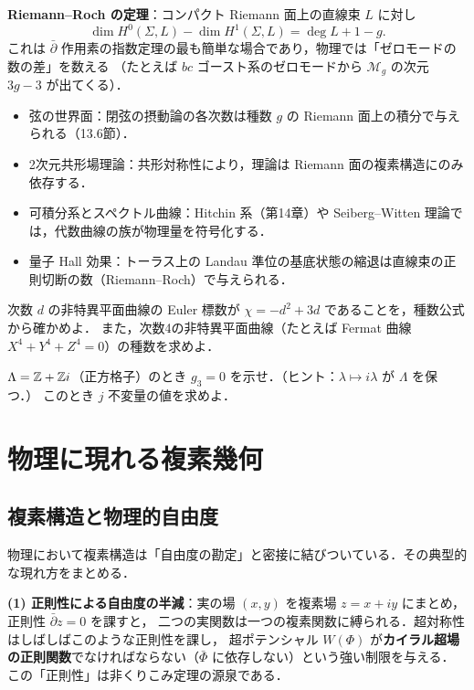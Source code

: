 \textbf{Riemann--Roch の定理}：コンパクト Riemann 面上の直線束 $L$ に対し
\begin{equation}
  \dim H^0(\Sigma,L) - \dim H^1(\Sigma,L) = \deg L + 1 - g .
\end{equation}
これは $\bar\partial$ 作用素の指数定理の最も簡単な場合であり，物理では「ゼロモードの数の差」を数える
（たとえば $bc$ ゴースト系のゼロモードから $\mathcal{M}_g$ の次元 $3g-3$ が出てくる）．

\begin{physbox}
\begin{itemize}
  \item 弦の世界面：閉弦の摂動論の各次数は種数 $g$ の Riemann 面上の積分で与えられる（13.6節）．
  \item 2次元共形場理論：共形対称性により，理論は Riemann 面の複素構造にのみ依存する．
  \item 可積分系とスペクトル曲線：Hitchin 系（第14章）や Seiberg--Witten 理論では，代数曲線の族が物理量を符号化する．
  \item 量子 Hall 効果：トーラス上の Landau 準位の基底状態の縮退は直線束の正則切断の数（Riemann--Roch）で与えられる．
\end{itemize}
\end{physbox}

次数 $d$ の非特異平面曲線の Euler 標数が $\chi=-d^2+3d$ であることを，種数公式から確かめよ．
また，次数4の非特異平面曲線（たとえば Fermat 曲線 $X^4+Y^4+Z^4=0$）の種数を求めよ．

$\Lambda=\mathbb{Z}+\mathbb{Z} i$（正方格子）のとき $g_3=0$ を示せ．（ヒント：$\lambda\mapsto i\lambda$ が $\Lambda$ を保つ．）
このとき $j$ 不変量の値を求めよ．

\section{物理に現れる複素幾何}

\subsection{複素構造と物理的自由度}

物理において複素構造は「自由度の勘定」と密接に結びついている．その典型的な現れ方をまとめる．

\textbf{(1) 正則性による自由度の半減}：実の場 $(x,y)$ を複素場 $z=x+iy$ にまとめ，正則性 $\bar\partial z=0$ を課すと，
二つの実関数は一つの複素関数に縛られる．超対称性はしばしばこのような正則性を課し，
超ポテンシャル $W(\Phi)$ が\textbf{カイラル超場の正則関数}でなければならない（$\bar\Phi$ に依存しない）という強い制限を与える．
この「正則性」は非くりこみ定理の源泉である．

